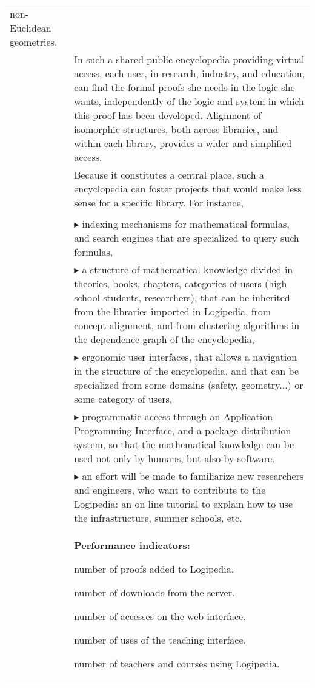 \begin{longtable}{|p{}|p{}|}
non-Euclidean geometries.\\
&
\hspace{0.4cm}
In such a shared public encyclopedia providing virtual access, each
user, in research, industry, and education, can find the formal proofs
she needs in the logic she wants, independently of the logic and system in
which this
proof has been developed.  Alignment of isomorphic structures, both
across libraries, and
within each library, provides a wider and simplified access.\\
&
\hspace{0.4cm}
Because it constitutes a central place, such a encyclopedia can foster
projects that would make less sense for a specific library. For instance,\\
\\
&
$\blacktriangleright$
indexing mechanisms for mathematical formulas, and search engines
  that are specialized to query such formulas,
\\
&
$\blacktriangleright$
a structure of mathematical knowledge divided in theories, books,
    chapters, categories of users (high school students, researchers),
    that can be inherited from the libraries imported in
      Logipedia, from concept alignment, and from clustering
    algorithms in the dependence graph of the encyclopedia,
\\
&
$\blacktriangleright$
  ergonomic user interfaces, that allows a navigation in the
    structure of the encyclopedia, and that can be specialized from
    some domains (safety, geometry...) or some category of users,
\\
&
$\blacktriangleright$ programmatic access through an Application Programming
    Interface, and a package distribution system, so that the
    mathematical knowledge can be used not only by humans, but also by
    software.
\\
&
$\blacktriangleright$
an effort will be made to familiarize new researchers and engineers,
who want to contribute to the Logipedia:
an on line tutorial to explain how to use the infrastructure,
summer schools, etc.
\\
&
\colorbox{color3}{\bf Performance indicators:}
\begin{compactitem}
\item number of proofs added to Logipedia.
\item number of downloads from the server.
\item number of accesses on the web interface.
\item number of uses of the teaching interface.
\item number of teachers and courses using Logipedia.
\end{compactitem}


\end{longtable}
